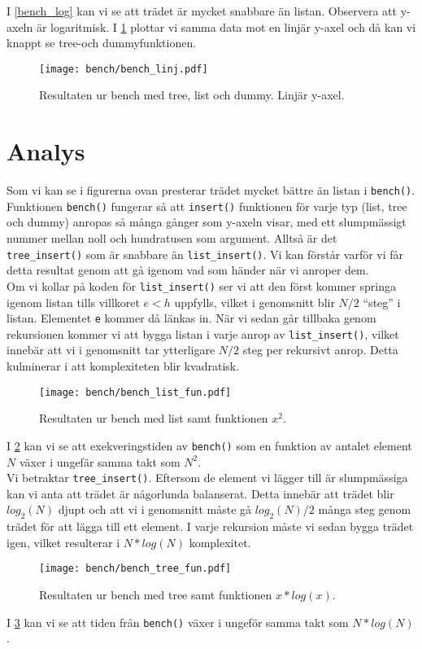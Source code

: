\documentclass[a4paper,11pt]{article}
\begin{document}
\noindent I \ref{bench_log} kan vi se att trädet är mycket snabbare än listan. Observera att y-axeln är logaritmisk. I \ref{bench_linj} plottar vi samma data mot en linjär y-axel och då kan vi knappt se tree-och dummyfunktionen.

\begin{figure}[H]
  \center
  \texttt{[image: bench/bench\_linj.pdf]}
  \caption{Resultaten ur bench med tree, list och dummy. Linjär y-axel.}
  \label{bench_linj}
\end{figure}
\section*{Analys}
Som vi kan se i figurerna ovan presterar trädet mycket bättre än listan i {\tt bench()}.\\
Funktionen {\tt bench()} fungerar så att {\tt insert()} funktionen för varje typ (list, tree och dummy) anropas så många gånger som y-axeln visar, med ett slumpmässigt nummer mellan noll och hundratusen som argument. Alltså är det {\tt tree\_insert()} som är snabbare än {\tt list\_insert()}. Vi kan förstår varför vi får detta resultat genom att gå igenom vad som händer när vi anroper dem.\\
Om vi kollar på koden för {\tt list\_insert()} ser vi att den först kommer springa igenom listan tills villkoret \(e < h\) uppfylls, vilket i genomsnitt blir \(N/2\) ``steg'' i listan. Elementet {\tt e} kommer då länkas in. När vi sedan går tillbaka genom rekursionen kommer vi att bygga listan i varje anrop av {\tt list\_insert()}, vilket innebär att vi i genomsnitt tar ytterligare \(N/2\) steg per rekursivt anrop. Detta kulminerar i att komplexiteten blir kvadratisk.

\begin{figure}[H]
  \center
  \texttt{[image: bench/bench\_list\_fun.pdf]}
  \caption{Resultaten ur bench med list samt funktionen \(x^2\).}
  \label{bench_list_fun}
\end{figure}

\noindent I \ref{bench_list_fun} kan vi se att exekveringstiden av {\tt bench()} som en funktion av antalet element \(N\) växer i ungefär samma takt som \(N^2\).\\

\noindent Vi betraktar {\tt tree\_insert()}. Eftersom de element vi lägger till är slumpmässiga kan vi anta att trädet är någorlunda balanserat. Detta innebär att trädet blir \(log_2(N)\) djupt och att vi i genomsnitt måste gå \(log_2(N)/2\) många steg genom trädet för att lägga till ett element. I varje rekursion måste vi sedan bygga trädet igen, vilket resulterar i \(N*log(N)\) komplexitet.
\begin{figure}[H]
  \center
  \texttt{[image: bench/bench\_tree\_fun.pdf]}
  \caption{Resultaten ur bench med tree samt funktionen \(x * log(x)\).}
  \label{bench_tree_fun}
\end{figure}
\noindent I \ref{bench_tree_fun} kan vi se att tiden från {\tt bench()} växer i ungeför samma takt som \(N*log(N)\).
\end{document}
